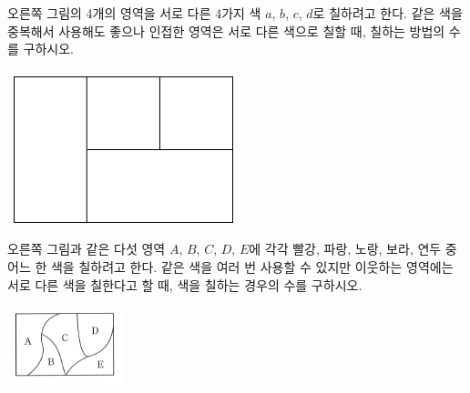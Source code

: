 \documentclass[a4paper]{oblivoir}
\begin{document}
%
\begin{minipage}{.65\textwidth}
\begin{Exercise}
오른쪽 그림의 4개의 영역을 서로 다른 4가지 색 \(a\), \(b\), \(c\), \(d\)로 칠하려고 한다.
같은 색을 중복해서 사용해도 좋으나 인접한 영역은 서로 다른 색으로 칠할 때, 칠하는 방법의 수를 구하시오.
\end{Exercise}
\end{minipage}
\quad
\begin{minipage}{.25\textwidth}
\includegraphics[width=.5\textwidth]{6}
\end{minipage}


%
\begin{minipage}{.65\textwidth}
\begin{Exercise}
오른쪽 그림과 같은 다섯 영역 \(A\), \(B\), \(C\), \(D\), \(E\)에 각각 빨강, 파랑, 노랑, 보라, 연두 중 어느 한 색을 칠하려고 한다.
같은 색을 여러 번 사용할 수 있지만 이웃하는 영역에는 서로 다른 색을 칠한다고 할 때, 색을 칠하는 경우의 수를 구하시오.
\end{Exercise}
\end{minipage}
\quad
\begin{minipage}{.25\textwidth}
\includegraphics[width=.5\textwidth]{7}
\end{minipage}

\end{document}
